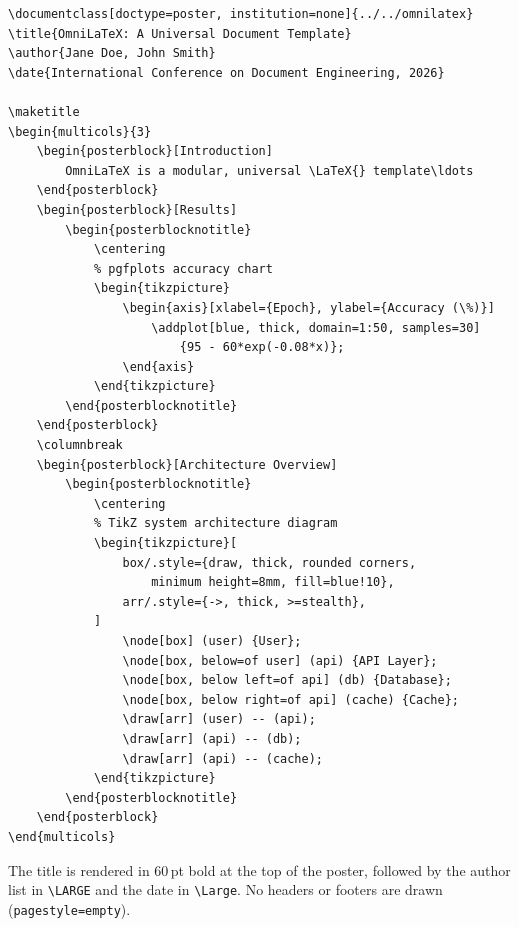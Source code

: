 \begin{verbatim}
\documentclass[doctype=poster, institution=none]{../../omnilatex}
\title{OmniLaTeX: A Universal Document Template}
\author{Jane Doe, John Smith}
\date{International Conference on Document Engineering, 2026}

\maketitle
\begin{multicols}{3}
    \begin{posterblock}[Introduction]
        OmniLaTeX is a modular, universal \LaTeX{} template\ldots
    \end{posterblock}
    \begin{posterblock}[Results]
        \begin{posterblocknotitle}
            \centering
            % pgfplots accuracy chart
            \begin{tikzpicture}
                \begin{axis}[xlabel={Epoch}, ylabel={Accuracy (\%)}]
                    \addplot[blue, thick, domain=1:50, samples=30]
                        {95 - 60*exp(-0.08*x)};
                \end{axis}
            \end{tikzpicture}
        \end{posterblocknotitle}
    \end{posterblock}
    \columnbreak
    \begin{posterblock}[Architecture Overview]
        \begin{posterblocknotitle}
            \centering
            % TikZ system architecture diagram
            \begin{tikzpicture}[
                box/.style={draw, thick, rounded corners,
                    minimum height=8mm, fill=blue!10},
                arr/.style={->, thick, >=stealth},
            ]
                \node[box] (user) {User};
                \node[box, below=of user] (api) {API Layer};
                \node[box, below left=of api] (db) {Database};
                \node[box, below right=of api] (cache) {Cache};
                \draw[arr] (user) -- (api);
                \draw[arr] (api) -- (db);
                \draw[arr] (api) -- (cache);
            \end{tikzpicture}
        \end{posterblocknotitle}
    \end{posterblock}
\end{multicols}

\end{verbatim}

The title is rendered in 60\,pt bold at the top of the poster, followed by
the author list in \texttt{\textbackslash LARGE} and the date in
\texttt{\textbackslash Large}.  No headers or footers are drawn
(\texttt{pagestyle=empty}).
